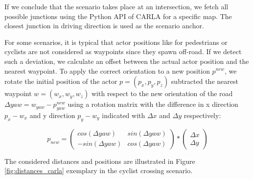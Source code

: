 \documentclass[conference, 11pt]{IEEEtran}
\begin{document}
If we conclude that the scenario takes place at an intersection, we fetch all possible junctions using the Python API of CARLA for a specific map. The closest junction in driving direction is used  as the scenario anchor. 

For some scenarios, it is typical that actor positions like for pedestrians or cyclists are not considered as waypoints since they spawn off-road.  If we detect such a deviation, we calculate an offset between the actual actor position and the nearest waypoint. To apply the correct orientation to a new position $p^{new}$, we rotate the initial position of the actor $p = (p_x,p_y,p_z)$ subtracted the nearest waypoint $w = (w_x, w_y, w_z)$ with respect to the new orientation of the road $\Delta yaw = w_{yaw} - p^{new}_{yaw}$  using a rotation matrix with the difference in x direction $p_x - w_x$ and y direction $p_y - w_y$ indicated with $\Delta x$ and $\Delta y$ respectively:

\begin{equation}
	p_{new} = \left(\begin{matrix} cos(\Delta yaw) & sin(\Delta yaw) \\ - sin(\Delta yaw) & cos(\Delta yaw) \end{matrix}\right) *  \left(\begin{matrix} \Delta x \\ \Delta y \end{matrix}\right) 
\end{equation}


The considered distances and positions are illustrated  in Figure \ref{fig:distances_carla} exemplary in the cyclist crossing scenario.
\end{document}
